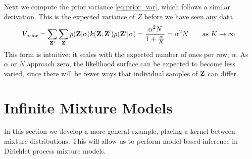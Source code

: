 
Next we compute the prior variance \eqref{eq:prior_var}, which follows a similar derivation.  This is the expected variance of $Z$ before we have seen any data.
\begin{align}
V_{\textrm{prior}} 
 = \sum_{\mathbf{Z}'} \sum_{\mathbf{Z}} p(\mathbf{Z} | \alpha) k(\mathbf{Z}, \mathbf{Z}') p(\mathbf{Z}' | \alpha) 
 = \frac{\alpha^2 N}{1 + \frac{\alpha}{K}} 
 = \alpha^2 N  \qquad \textrm{as $K \rightarrow \infty$}
\label{eq:prior_variance_ibp}
\end{align}
%
This form is intuitive:  it scales with the expected number of ones per row, $\alpha$.  As $\alpha$ or $N$ approach zero, the likelihood surface can be expected to become less varied, since there will be fewer ways that individual samples of $\mathbf{Z}$ can differ.




\section{Infinite Mixture Models}

In this section we develop a more general example, placing a kernel between mixture distributions.  This will allow us to perform model-based inference in Dirichlet process mixture models.

